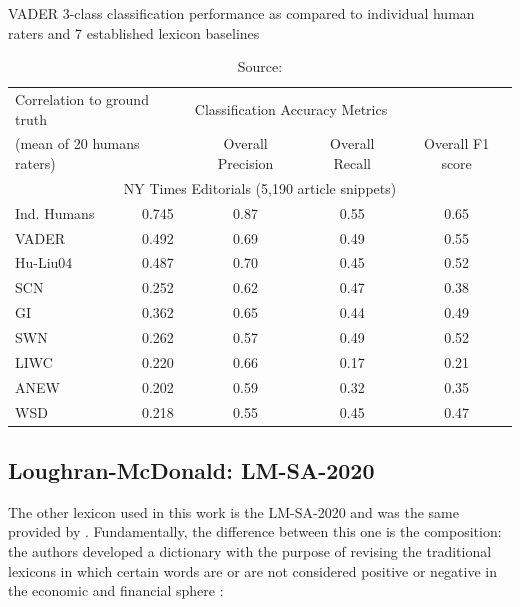 \begin{table}[!h]
\centering
\caption{VADER 3-class classification performance as compared to individual human raters and 7 established lexicon baselines}
\begin{tabular}{l|c|c|c|c}
\hline
\multicolumn{2}{l|}{Correlation to ground truth} & \multicolumn{3}{l}{Classification Accuracy Metrics}   \\ \cline{3-5} 
\multicolumn{2}{l|}{(mean of 20 humans raters)}  & Overall Precision & Overall Recall & Overall F1 score \\ \hline
\multicolumn{5}{c}{NY Times Editorials (5,190 article snippets)}                                         \\ \hline
Ind. Humans                & 0.745               & 0.87              & 0.55           & 0.65             \\
VADER                      & 0.492               & 0.69              & 0.49           & 0.55             \\
Hu-Liu04                   & 0.487               & 0.70              & 0.45           & 0.52             \\
SCN                        & 0.252               & 0.62              & 0.47           & 0.38             \\
GI                         & 0.362               & 0.65              & 0.44           & 0.49             \\
SWN                        & 0.262               & 0.57              & 0.49           & 0.52             \\
LIWC                       & 0.220               & 0.66              & 0.17           & 0.21             \\
ANEW                       & 0.202               & 0.59              & 0.32           & 0.35             \\
WSD                        & 0.218               & 0.55              & 0.45           & 0.47             \\ \hline 
\end{tabular}
\caption*{Source: \citep[p. 223]{hutto2014vader}}
\label{tab:vaderscore}
\end{table}

\subsection{Loughran-McDonald: LM-SA-2020}  \label{subsec:loughran}

The other lexicon used in this work is the LM-SA-2020 and was the same provided by \cite{loughran2011liability}. Fundamentally, the difference between this one is the composition: the authors developed a dictionary with the purpose of revising the traditional lexicons in which certain words are or are not considered positive or negative in the economic and financial sphere \citep[p. 35]{loughran2011liability}:

